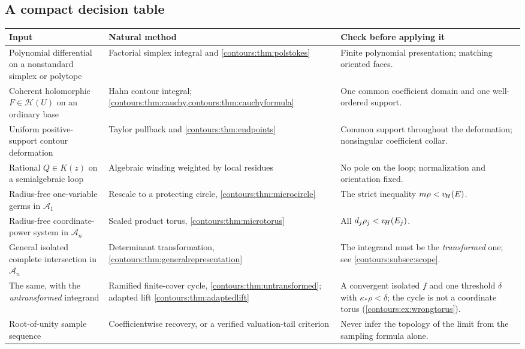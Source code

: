 \documentclass[11pt,letterpaper]{article}
\theoremstyle{definition}
\theoremstyle{remark}
\newcommand{\HH}{\mathcal H}\newcommand{\A}{\mathscr A}\newcommand{\OO}{\mathcal O}
\numberwithin{equation}{section}
\begin{document}
\subsection{A compact decision table}
\begin{center}\small
\begin{longtable}{@{}L{0.28\textwidth}L{0.34\textwidth}L{0.30\textwidth}@{}}
\toprule
Input & Natural method & Check before applying it\\\midrule\endhead
Polynomial differential on a nonstandard simplex or polytope
  & Factorial simplex integral and \cref{contours:thm:polstokes}
  & Finite polynomial presentation; matching oriented faces.\\[0.45em]
Coherent holomorphic $F\in\HH(U)$ on an ordinary base
  & Hahn contour integral; \cref{contours:thm:cauchy,contours:thm:cauchyformula}
  & One common coefficient domain and one well-ordered support.\\[0.45em]
Uniform positive-support contour deformation
  & Taylor pullback and \cref{contours:thm:endpoints}
  & Common support throughout the deformation; nonsingular coefficient
    collar.\\[0.45em]
Rational $Q\in K(z)$ on a semialgebraic loop
  & Algebraic winding weighted by local residues
  & No pole on the loop; normalization and orientation fixed.\\[0.45em]
Radius-free one-variable germs in $\A_1$
  & Rescale to a protecting circle, \cref{contours:thm:microcircle}
  & The strict inequality $m\rho<v_{\!H}(E)$.\\[0.45em]
Radius-free coordinate-power system in $\A_n$
  & Scaled product torus, \cref{contours:thm:microtorus}
  & All $d_j\rho_j<v_{\!H}(E_j)$.\\[0.45em]
General isolated complete intersection in $\A_n$
  & Determinant transformation, \cref{contours:thm:generalrepresentation}
  & The integrand must be the \emph{transformed} one; see
    \cref{contours:subsec:scope}.\\[0.45em]
The same, with the \emph{untransformed} integrand
  & Ramified finite-cover cycle, \cref{contours:thm:untransformed}; adapted lift
    \cref{contours:thm:adaptedlift}
  & A convergent isolated $f$ and one threshold $\delta$ with
    $\kappa_*\rho<\delta$; the cycle is not a coordinate torus
    (\cref{contours:ex:wrongtorus}).\\[0.45em]
Root-of-unity sample sequence
  & Coefficientwise recovery, or a verified valuation-tail criterion
  & Never infer the topology of the limit from the sampling formula alone.\\
\bottomrule
\end{longtable}
\end{center}
\end{document}
